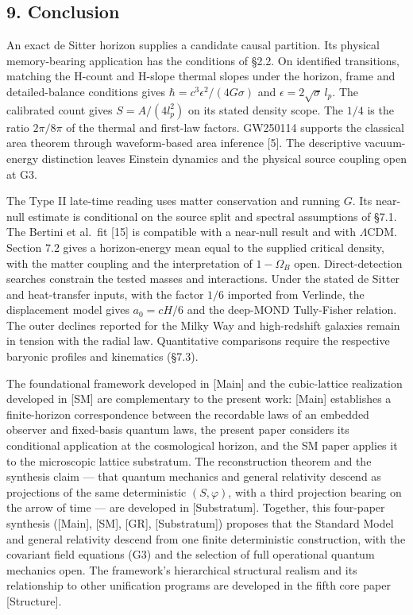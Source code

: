 \documentclass[
]{article}
\begin{document}
\hypertarget{conclusion}{%
\subsection{9. Conclusion}\label{conclusion}}

An exact de Sitter horizon supplies a candidate causal partition. Its
physical memory-bearing application has the conditions of §2.2. On
identified transitions, matching the H-count and H-slope thermal slopes
under the horizon, frame and detailed-balance conditions gives
\(\hbar=c^3\epsilon^2/(4G\sigma)\) and \(\epsilon=2\sqrt{\sigma}\,l_p\).
The calibrated count gives \(S=A/(4l_p^2)\) on its stated density scope.
The \(1/4\) is the ratio \(2\pi/8\pi\) of the thermal and first-law
factors. GW250114 supports the classical area theorem through
waveform-based area inference {[}5{]}. The descriptive vacuum-energy
distinction leaves Einstein dynamics and the physical source coupling
open at G3.

The Type II late-time reading uses matter conservation and running
\(G\). Its near-null estimate is conditional on the source split and
spectral assumptions of §7.1. The Bertini et al.~fit {[}15{]} is
compatible with a near-null result and with \(\Lambda\)CDM. Section 7.2
gives a horizon-energy mean equal to the supplied critical density, with
the matter coupling and the interpretation of \(1-\Omega_B\) open.
Direct-detection searches constrain the tested masses and interactions.
Under the stated de Sitter and heat-transfer inputs, with the factor
\(1/6\) imported from Verlinde, the displacement model gives
\(a_0=cH/6\) and the deep-MOND Tully-Fisher relation. The outer declines
reported for the Milky Way and high-redshift galaxies remain in tension
with the radial law. Quantitative comparisons require the respective
baryonic profiles and kinematics (§7.3).

The foundational framework developed in {[}Main{]} and the cubic-lattice
realization developed in {[}SM{]} are complementary to the present work:
{[}Main{]} establishes a finite-horizon correspondence between the
recordable laws of an embedded observer and fixed-basis quantum laws,
the present paper considers its conditional application at the
cosmological horizon, and the SM paper applies it to the microscopic
lattice substratum. The reconstruction theorem and the synthesis claim
--- that quantum mechanics and general relativity descend as projections
of the same deterministic \((S, \varphi)\), with a third projection
bearing on the arrow of time --- are developed in {[}Substratum{]}.
Together, this four-paper synthesis ({[}Main{]}, {[}SM{]}, {[}GR{]},
{[}Substratum{]}) proposes that the Standard Model and general
relativity descend from one finite deterministic construction, with the
covariant field equations (G3) and the selection of full operational
quantum mechanics open. The framework's hierarchical structural realism
and its relationship to other unification programs are developed in the
fifth core paper {[}Structure{]}.
\end{document}
